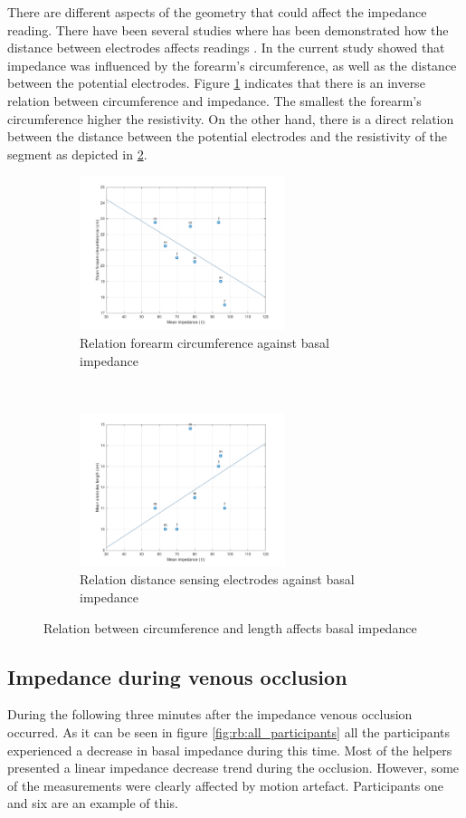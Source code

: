 There are different aspects of the geometry that could affect the impedance reading. There have been several studies where has been demonstrated how the distance between electrodes affects readings . In the current study showed that impedance was influenced by the forearm's circumference, as well as the distance between the potential electrodes. Figure \ref{fig:C_vs_Z} indicates that there is an inverse relation between circumference and impedance. The smallest the forearm's circumference higher the resistivity. On the other hand, there is a direct relation between the distance between the potential electrodes and the resistivity of the segment as depicted in \ref{fig:l_vs_Z}.

\begin{figure}[t!]
	\centering
	\begin{subfigure}[t]{0.5\textwidth}
		\centering
		\includegraphics[height=4.5cm]{figure2a}
		\caption{Relation forearm circumference against basal impedance}
		\label{fig:C_vs_Z}
	\end{subfigure}%
	~ 
	\begin{subfigure}[t]{0.5\textwidth}
		\centering
		\includegraphics[height=4.5cm]{figure2b}
		\caption{Relation distance sensing electrodes against basal impedance}
		\label{fig:l_vs_Z}
	\end{subfigure}
	\caption{Relation between circumference and length affects basal impedance}
	\label{fig:relation_geometry_vs_impedance}
\end{figure}

\subsection{Impedance during venous occlusion}
\label{section5.1.2}
During the following three minutes after the impedance venous occlusion occurred. As it can be seen in figure \ref{fig:rb:all_participants} all the participants experienced a decrease in basal impedance during this time. Most of the helpers presented a linear impedance decrease trend during the occlusion. However, some of the measurements were clearly affected by motion artefact. Participants one and six are an example of this. 

